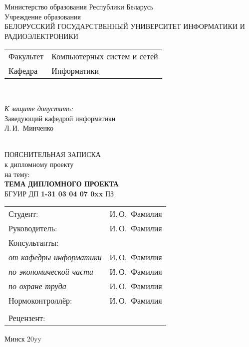 \begin{titlepage}
  \begin{center}
    Министерство образования Республики Беларусь\\[1em]
    Учреждение образования\\
    БЕЛОРУССКИЙ ГОСУДАРСТВЕННЫЙ УНИВЕРСИТЕТ ИНФОРМАТИКИ И РАДИОЭЛЕКТРОНИКИ\\[1em]

    \begin{minipage}{\textwidth}
      \begin{flushleft}
        \begin{tabular}{ l l }
          Факультет & Компьютерных систем и сетей\\
          Кафедра   & Информатики
        \end{tabular}
      \end{flushleft}
    \end{minipage}\\[1em]

    \begin{minipage}{\textwidth}
      \begin{flushright}
        \textit{К защите допустить:}\\
        Заведующий кафедрой информатики\\
        \underline{\hspace*{4.5cm}} Л.\,И.~Минченко
      \end{flushright}
    \end{minipage}\\[3em]

    {ПОЯСНИТЕЛЬНАЯ ЗАПИСКА}\\
    {к дипломному проекту}\\
    {на тему:}\\[1em]
    \textbf{\large ТЕМА ДИПЛОМНОГО ПРОЕКТА}\\[1em]


    {БГУИР ДП \textbf{1-31 03 04 07 0xx} ПЗ}\\[2em]
    
    \begin{tabular}{ p{}p{} }
      Студент: & И.\,О.~Фамилия \\
      Руководитель: & И.\,О.~Фамилия \\
      Консультанты: &\\
      \hspace*{3ex}\emph{от кафедры информатики} & И.\,О.~Фамилия \\
      \hspace*{3ex}\emph{по экономической части} & И.\,О.~Фамилия \\
      \hspace*{3ex}\emph{по охране труда} & И.\,О.~Фамилия \\
      Нормоконтроллёр: & И.\,О.~Фамилия \\
      & \\
      Рецензент: &
    \end{tabular}
    
    \vfill
    {\normalsize Минск 20yy}
  \end{center}
\end{titlepage}
